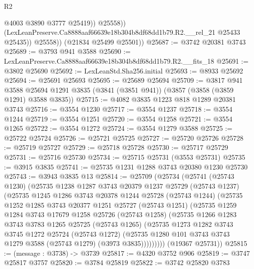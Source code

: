 \begin{lexlean}{R2}
\begin{coremodule}
                    @4003
                    @3890
                    @3777
                    @25419))
                @25558))
            (LexLeanPreserve.Ca8888aaf66639e18b304b8df68dd1b79.R2.__rel_21 @25433 @25435))
          @25558))
      (@21834 @25499 @25501))
@25687 := @3742 @20381 @3743
@25689 := @3793 @941 @3588
@25690 := LexLeanPreserve.Ca8888aaf66639e18b304b8df68dd1b79.R2.__fits_18
@25691 := @3802 @25690
@25692 := LexLeanStd.Sha256.initial
@25693 := @8933 @25692
@25694 := @25691 @25693
@25695 := @25689 @25694
@25709 := @3817
    @941
    @3588
    @25694
    @1291
    @3835
    (@3841 (@3851 @941))
    (@3857 (@3858 (@3859 @1291) @3588 @3835))
@25715 := @4082 @3835 @1223 @818 @1289 @20381 @3743
@25716 := @3554 @1230
@25717 := @3554 @1237
@25718 := @3554 @1244
@25719 := @3554 @1251
@25720 := @3554 @1258
@25721 := @3554 @1265
@25722 := @3554 @1272
@25724 := @3554 @1279 @3588
@25725 := @25722 @25724
@25726 := @25721 @25725
@25727 := @25720 @25726
@25728 := @25719 @25727
@25729 := @25718 @25728
@25730 := @25717 @25729
@25731 := @25716 @25730
@25734 := @25715 @25731 (@3553 @25731)
@25735 := @3915 @3835
@25741 := @25735 @1231 @1288 @3743 @20380 @1230 @25730
@25743 := @3943 @3835 @13
@25814 := @25709
    (@25734
      (@25741
        (@25743 @1230)
        (@25735
          @1238
          @1287
          @3743
          @20379
          @1237
          @25729
          (@25743 @1237)
          (@25735
            @1245
            @1286
            @3743
            @20378
            @1244
            @25728
            (@25743 @1244)
            (@25735
              @1252
              @1285
              @3743
              @20377
              @1251
              @25727
              (@25743 @1251)
              (@25735
                @1259
                @1284
                @3743
                @17679
                @1258
                @25726
                (@25743 @1258)
                (@25735
                  @1266
                  @1283
                  @3743
                  @3783
                  @1265
                  @25725
                  (@25743 @1265)
                  (@25735
                    @1273
                    @1282
                    @3743
                    @3745
                    @1272
                    @25724
                    (@25743 @1272)
                    (@25735 @1280 @101 @3743 @3743 @1279 @3588 (@25743 @1279) (@3973 @3835)))))))))
      (@19367 @25731))
@25815 := (message : @3738) -> @3739
@25817 := @4320 @3752 @906
@25819 := @3747 @25817 @3757
@25820 := @3784 @25819
@25822 := @3742 @25820 @3783

\end{coremodule}
\end{lexlean}
